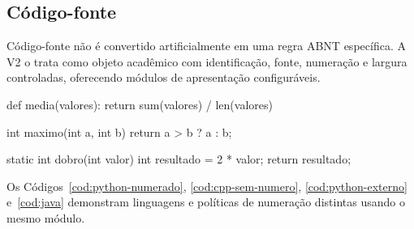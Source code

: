 \subsection{Código-fonte}

Código-fonte não é convertido artificialmente em uma regra ABNT específica. A V2 o trata como objeto acadêmico com identificação, fonte, numeração e largura controladas, oferecendo módulos de apresentação configuráveis.


\lstset{language=Python,numbers=left,stepnumber=1,numbersep=8pt}
\label{cod:python-numerado}
\begin{ufclisting}[here]
def media(valores):
    return sum(valores) / len(valores)
\end{ufclisting}

\lstset{language=C++,numbers=none}
\label{cod:cpp-sem-numero}
\begin{ufclisting}[here]
int maximo(int a, int b) {
    return a > b ? a : b;
}
\end{ufclisting}

\label{cod:python-externo}
\begin{ufcobjeto}[here]
\end{ufcobjeto}

\lstset{language=Java,numbers=left,stepnumber=2,numbersep=8pt}
\label{cod:java}
\begin{ufclisting}[here]
static int dobro(int valor) {
    int resultado = 2 * valor;
    return resultado;
}
\end{ufclisting}
\lstset{numbers=none,stepnumber=1}

Os Códigos~\ref{cod:python-numerado}, \ref{cod:cpp-sem-numero}, \ref{cod:python-externo} e~\ref{cod:java} demonstram linguagens e políticas de numeração distintas usando o mesmo módulo.

